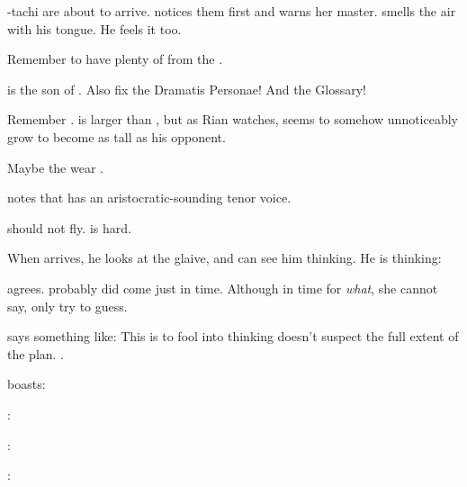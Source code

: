 \begin{changes}
    \begin{comment}
      \subparagraph{Teshrial arrives}
    \end{comment}
    \Teshrial-tachi are about to arrive. 
    \Criseis{} notices them first and warns her master. 
    \Ishnaruchaefir{} smells the air with his tongue. 
    He feels it too.
    
    Remember to have plenty of  from the \resphain. 
    
    \Teshrial{} is the son of \Zereth. 
    Also fix the Dramatis Personae! 
    And the Glossary! 
    
    Remember . 
    \Teshrial is larger than \Ishnaruchaefir, but as Rian watches, \Ishnaruchaefir seems to somehow unnoticeably grow to become as tall as his opponent. 
    
    Maybe the \resphain wear . 
    
    \Criseis{} notes that \Teshrial{} has an aristocratic-sounding tenor voice. 
    
    \Achsah should not fly. 
     is hard. 
    
    When \Teshrial arrives, he looks at the glaive, and \Criseis can see him thinking. 
    He is thinking: 
      
    \Criseis agrees. \Teshrial probably did come just in time. 
    Although in time for \emph{what}, she cannot say, only try to guess. 
    
    \Ishnaruchaefir{} says something like: 
    This is to fool \Teshrial{} into thinking \Ishnaruchaefir{} doesn't suspect the full extent of the \noggyal{} plan. 
    . 
    
    \Teshrial boasts:
    \begin{prose}
      \Teshrial:
      
      \Ishnaruchaefir: 
      
      \Teshrial:
      

\end{prose}
\end{changes}
